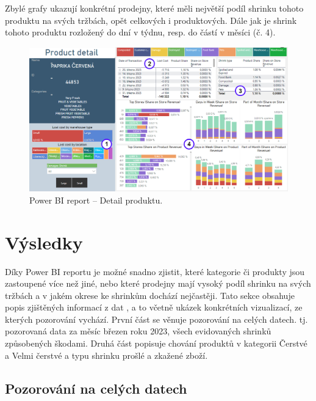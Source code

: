 Zbylé grafy ukazují konkrétní prodejny, které měli největší podíl shrinku tohoto produktu na svých tržbách, opět celkových i produktových. Dále jak je shrink tohoto produktu rozložený do dní v týdnu, resp. do částí v měsíci (č. 4).

\begin{figure}[h!]
    \centering
    \captionsetup{justification=centering}
    \includegraphics[width=\textwidth]{obrazky/PBI/productdetail.png}
    \caption{Power BI report -- Detail produktu.}
    \label{obr:PBI:detail}
\end{figure}

\section{Výsledky}

Díky Power BI reportu je možné snadno zjistit, které kategorie či produkty jsou zastoupené více než jiné, nebo které prodejny mají vysoký podíl shrinku na svých tržbách a v jakém okrese ke shrinkům dochází nejčastěji. Tato sekce obsahuje popis zjištěných informací z dat , a to včetně ukázek konkrétních vizualizací, ze kterých pozorování vychází.
První část se věnuje pozorování na celých datech. tj. pozorovaná data za měsíc březen roku 2023, všech evidovaných shrinků způsobených škodami. Druhá část popisuje chování produktů v kategorii Čerstvé a Velmi čerstvé a typu shrinku prošlé a zkažené zboží.

\subsection*{Pozorování na celých datech}



\label{sec:vizualizace:vysl}
